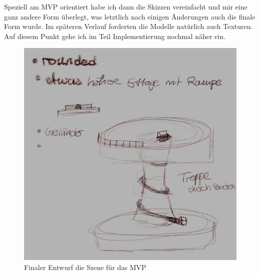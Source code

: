 \par
Speziell am MVP orientiert habe ich dann die Skizzen vereinfacht und mir eine ganz andere Form überlegt, was letztlich nach einigen Änderungen auch die finale Form wurde. Im späteren Verlauf forderten die Modelle natürlich auch Texturen. Auf diesem Punkt gehe ich im Teil Implementierung nochmal näher ein.
\begin{figure}[h]
	\centering
	\includegraphics[height=0.3\pageheight,keepaspectratio]{pics/5} 
	\caption{Finaler Entwurf die Szene für das MVP}
\end{figure}
